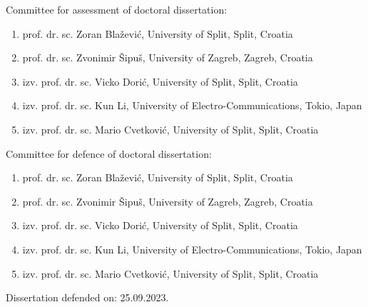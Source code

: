 \documentclass[12pt,twoside,onecolumn]{book}
\begin{document}
\begin{titlepage}
\begin{flushleft}
        \newpage
        \textnormal{}
        \vskip 30mm
        Committee for assessment of doctoral dissertation:
        \begin{enumerate}
        \item prof. dr. sc. Zoran Blažević, University of Split, Split, Croatia
        \item prof. dr. sc. Zvonimir Šipuš, University of Zagreb, Zagreb, Croatia
        \item izv. prof. dr. sc. Vicko Dorić, University of Split, Split, Croatia
        \item izv. prof. dr. sc. Kun Li, University of Electro-Communications, Tokio, Japan
        \item izv. prof. dr. sc. Mario Cvetković, University of Split, Split, Croatia
        \end{enumerate}
        
        \vskip 15mm
        Committee for defence of doctoral dissertation:
        \begin{enumerate}
        \item prof. dr. sc. Zoran Blažević, University of Split, Split, Croatia
        \item prof. dr. sc. Zvonimir Šipuš, University of Zagreb, Zagreb, Croatia
        \item izv. prof. dr. sc. Vicko Dorić, University of Split, Split, Croatia
        \item izv. prof. dr. sc. Kun Li, University of Electro-Communications, Tokio, Japan
        \item izv. prof. dr. sc. Mario Cvetković, University of Split, Split, Croatia
        \end{enumerate}
        \vskip 15mm
        Dissertation defended on: 25.09.2023.
    \end{flushleft}
    
    
    
    
    
    
\end{titlepage}

\tableofcontents
\setcounter{tocdepth}{2}
\setcounter{secnumdepth}{2}

\clearpage
{}
\setlength\cftbeforetabskip{10pt}
\begin{spacing}{1}
\listoftables
{}
\end{spacing}
\end{document}
